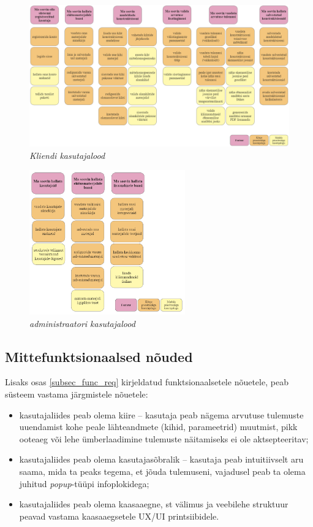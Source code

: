 \begin{figure}[ht]
    \centering
    \includegraphics[width=1\textwidth]{figures/analysis/client_userstories.png}
    \caption[Funktsionaalsed nõuded, kliendi kasutajalood]{\textit{Kliendi kasutajalood}}
    \label{fig:client_userstories}
\end{figure}

\begin{figure}[ht]
    \centering
    \includegraphics[width=0.6\textwidth]{figures/analysis/admin_userstories.png}
    \caption[Funktsionaalsed nõuded, administraatori kasutajalood]{\textit{administraatori kasutajalood}}
    \label{fig:admin_userstories}
\end{figure}

\subsection{Mittefunktsionaalsed nõuded}
Lisaks osas \ref{subsec_func_req} kirjeldatud funktsionaalsetele nõuetele, peab süsteem vastama järgmistele nõuetele:
\begin{itemize}
    \item kasutajaliides peab olema kiire -- kasutaja peab nägema arvutuse tulemuste uuendamist kohe peale 
lähteandmete (kihid, parameetrid) muutmist, pikk ooteaeg või lehe ümberlaadimine tulemuste näitamiseks ei ole aktsepteeritav;
    \item kasutajaliides peab olema kasutajasõbralik -- kasutaja peab intuitiivselt aru saama, mida ta peaks tegema, et 
jõuda tulemuseni, vajadusel peab ta olema juhitud \textit{popup}-tüüpi infoplokidega;
    \item kasutajaliides peab olema kaasaaegne, st välimus ja veebilehe struktuur peavad
vastama kaasaaegsetele UX/UI printsiibidele.
\end{itemize}
